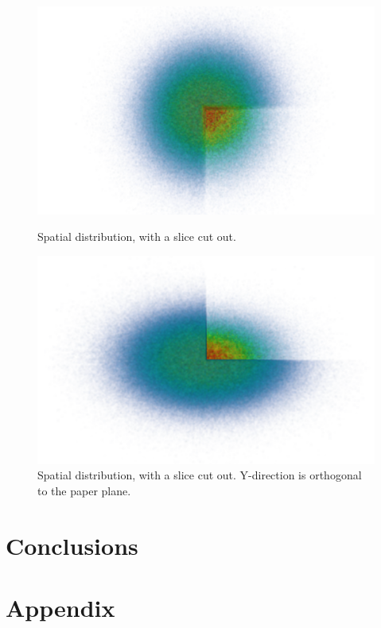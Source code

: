 \documentclass[english, a4paper]{article}
\begin{document}
\begin{figure}[H]
\begin{minipage}[t]{0.48\linewidth}
  \includegraphics[width=\textwidth]{../modifiedMortenCode/figures/spatialDistributione8.png}
  \caption{Spatial distribution, with a slice cut out.}
  \label{fig:spatialDistribution}
\end{minipage}
\quad
\begin{minipage}[t]{0.48\linewidth}
\includegraphics[width=\textwidth]{../modifiedMortenCode/figures/spatialDistributione8yz.png}
  \caption{Spatial distribution, with a slice cut out. Y-direction is orthogonal to the paper plane.}
  \label{fig:spatialDistribution2}
\end{minipage}
\end{figure}

\section{Conclusions}


\section{Appendix}


\end{document}

